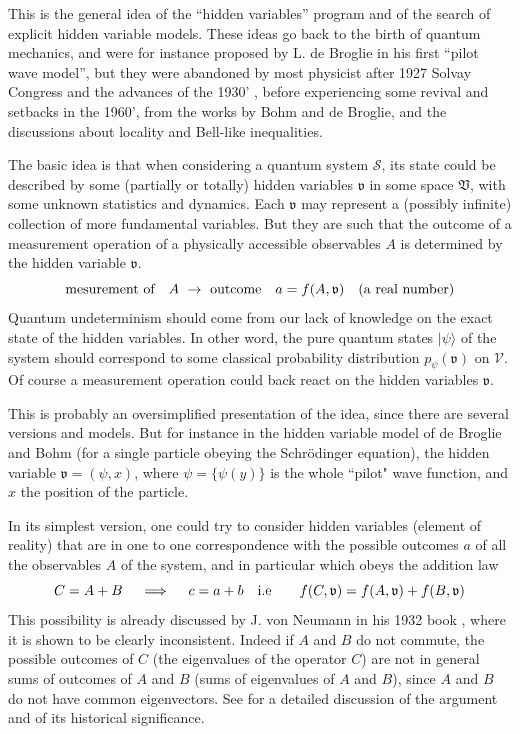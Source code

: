 This is the general idea of the ``hidden variables'' program and of the search of explicit hidden variable models. These ideas go back to the birth of quantum mechanics, and were for instance proposed by L. de Broglie in his first ``pilot wave model'', but they were abandoned by most physicist after 1927 Solvay Congress and the advances of the 1930' , before experiencing some revival  and setbacks in the 1960', from the works by Bohm and de Broglie, and the discussions about locality and Bell-like inequalities.

The basic idea is that when considering a quantum system $\mathcal{S}$, its state could be described by some (partially or totally) hidden variables $\mathfrak{v}$ in some space $\mathfrak{V}$, with some unknown statistics and dynamics. 
Each $\mathfrak{v}$ may represent a (possibly infinite) collection of more fundamental variables.
But they are such that the outcome of a measurement operation of a physically accessible  observables $A$ is  determined by the hidden variable $\mathfrak{v}$. \begin{equation}
\label{m2oVD}
\text{mesurement of}\quad A\ \to \ \text{outcome}\quad a=f(A,\frak{v})\quad\text{(a real number)}
\end{equation}
Quantum undeterminism should come from our lack of knowledge on the exact state of the hidden variables.
In other word, the pure quantum states $|\psi\rangle$ of the system should correspond to some classical probability distribution $p_\psi(\mathfrak{v})$ on $\mathcal{V}$.
Of course a measurement operation could back react on the hidden variables $\mathfrak{v}$.

This is probably an oversimplified presentation of the idea, since there are several versions and models. But for instance in the hidden variable model of de Broglie and Bohm (for a single particle obeying the Schr\"{o}dinger equation), the hidden variable $\mathfrak{v}=(\psi,x)$, where $\psi=\{\psi(y)\}$ is the whole ``pilot" wave function, and $x$ the position of the particle.

In its simplest version, one could try to consider hidden variables (element of reality) that are in one to one correspondence with the possible outcomes $a$ of all the observables $A$ of the system, and in particular which obeys the addition law
\begin{equation}
\label{CHVvN}
C=A+B \quad\implies\quad c=a+b\quad\text{i.e}\qquad f(C,\frak{v})=f(A,\frak{v})+f(B,\frak{v})
\end{equation}
This possibility is already discussed by J. von Neumann in his 1932 book
\cite{vonNeumann32G,vonNeumann32}, 
where it is shown to be clearly inconsistent. Indeed if $A$ and $B$ do not commute, the possible outcomes of $C$ (the eigenvalues of the operator $C$) are not in general sums of outcomes of $A$ and $B$ (sums of eigenvalues of $A$ and $B$), since $A$ and $B$ do not have common eigenvectors.
See \cite{Bub:2010kx} for a detailed discussion of the argument and of its historical significance.

